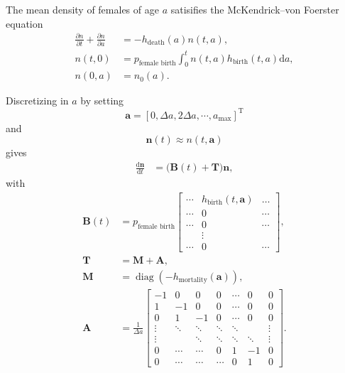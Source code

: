 \documentclass[12pt]{article}
\renewcommand{\vec}[1]{\mathbf{#1}}
\newcommand{\mat}[1]{\mathbf{#1}}
\newcommand{\md}{\mathrm{d}}
\newcommand{\mT}{\mathrm{T}}
\begin{document}
The mean density of females of age $a$ satisifies the McKendrick--von
Foerster equation
\begin{equation}
  \begin{split}
    \frac{\partial n}{\partial t} + \frac{\partial n}{\partial a}
    &= - h_{\text{death}}(a) n(t, a),
    \\
    n(t, 0) &=
    p_{\text{female birth}}
    \int_0^t n(t, a) h_{\text{birth}}(t, a) \md a,
    \\
    n(0, a) &= n_0(a).
  \end{split}
\end{equation}

Discretizing in $a$ by setting
\begin{equation}
  \vec{a}
  = \left[0, \Delta a, 2 \Delta a, \cdots, a_{\text{max}} \right]^{\mT}
\end{equation}
and
\begin{equation}
  \vec{n}(t) \approx n(t, \vec{a})
\end{equation}
gives
\begin{equation}
  \begin{split}
    \frac{\md \vec{n}}{\md t}
    &= \big(\mat{B}(t) + \mat{T}\big) \vec{n},
  \end{split}
\end{equation}
with
\begin{equation}
  \begin{split}
    \mat{B}(t)
    &= p_{\text{female birth}}
    \begin{bmatrix}
      \cdots & h_{\text{birth}}(t, \vec{a}) & \dots
      \\
      \cdots & 0 & \cdots
      \\
      \cdots & 0 & \cdots
      \\
      & \vdots &
      \\
      \cdots & 0 & \cdots
    \end{bmatrix},
    \\
    \mat{T}
    &= \mat{M} + \mat{A},
    \\
    \mat{M}
    &= \operatorname{diag}\left(- h_{\text{mortality}}(\vec{a})\right),
    \\
    \mat{A}
    &= \frac{1}{\Delta a}
    \begin{bmatrix}
      -1 & 0 & 0 & 0 & \cdots & 0 & 0
      \\
      1 & -1 & 0 & 0 & \cdots & 0 & 0
      \\
      0 & 1 & -1 & 0 & \cdots & 0 & 0
      \\
      \vdots & \ddots & \ddots & \ddots & \ddots &  & \vdots
      \\
      \vdots &  & \ddots & \ddots & \ddots & \ddots & \vdots
      \\
      0  & \cdots & \cdots & 0 & 1 & - 1 & 0
      \\
      0  & \cdots & \cdots & \cdots & 0 & 1 & 0
    \end{bmatrix}.
  \end{split}
\end{equation}
\end{document}
